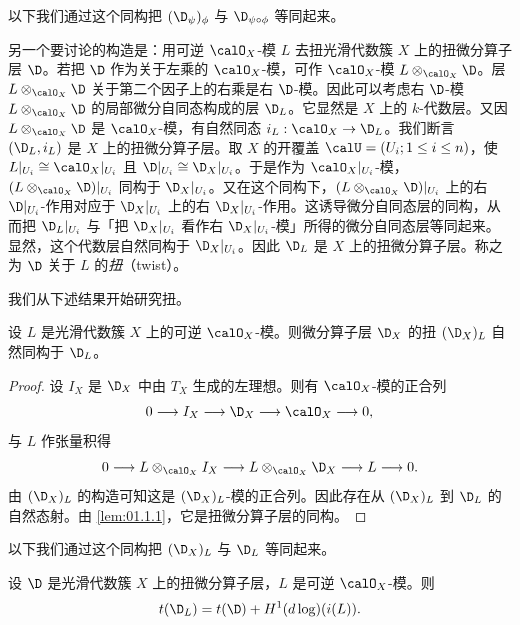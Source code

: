 以下我们通过这个同构把 $(\D_\psi)_\phi$ 与 $\D_{\psi\circ\phi}$ 等同起来。

另一个要讨论的构造是：用可逆 $\calO_X$-模 $L$ 去扭光滑代数簇 $X$ 上的扭微分算子层 $\D$。若把 $\D$ 作为关于左乘的 $\calO_X$-模，可作 $\calO_X$-模 $L\otimes_{\calO_X}\D$。层 $L\otimes_{\calO_X}\D$ 关于第二个因子上的右乘是右 $\D$-模。因此可以考虑右 $\D$-模 $L\otimes_{\calO_X}\D$ 的局部微分自同态构成的层 $\D_L$。它显然是 $X$ 上的 $k$-代数层。又因 $L\otimes_{\calO_X}\D$ 是 $\calO_X$-模，有自然同态 $i_L:\calO_X\to\D_L$。我们断言 $(\D_L,i_L)$ 是 $X$ 上的扭微分算子层。取 $X$ 的开覆盖 $\calU=(U_i;1\le i\le n)$，使 $L|_{U_i}\cong\calO_X|_{U_i}$ 且 $\D|_{U_i}\cong\D_X|_{U_i}$。于是作为 $\calO_X|_{U_i}$-模，$(L\otimes_{\calO_X}\D)|_{U_i}$ 同构于 $\D_X|_{U_i}$。又在这个同构下，$(L\otimes_{\calO_X}\D)|_{U_i}$ 上的右 $\D|_{U_i}$-作用对应于 $\D_X|_{U_i}$ 上的右 $\D_X|_{U_i}$-作用。这诱导微分自同态层的同构，从而把 $\D_L|_{U_i}$ 与「把 $\D_X|_{U_i}$ 看作右 $\D_X|_{U_i}$-模」所得的微分自同态层等同起来。显然，这个代数层自然同构于 $\D_X|_{U_i}$。因此 $\D_L$ 是 $X$ 上的扭微分算子层。称之为 $\D$ 关于 $L$ 的\emph{扭}（twist）。

我们从下述结果开始研究扭。

\begin{lemma}\label{lem:01.1.7}
设 $L$ 是光滑代数簇 $X$ 上的可逆 $\calO_X$-模。则微分算子层 $\D_X$ 的扭 $(\D_X)_L$ 自然同构于 $\D_L$。
\end{lemma}

\begin{proof}
设 $I_X$ 是 $\D_X$ 中由 $T_X$ 生成的左理想。则有 $\calO_X$-模的正合列
$$0\longrightarrow I_X\longrightarrow\D_X\longrightarrow\calO_X\longrightarrow 0,$$
与 $L$ 作张量积得
$$0\longrightarrow L\otimes_{\calO_X}I_X\longrightarrow L\otimes_{\calO_X}\D_X\longrightarrow L\longrightarrow 0.$$
由 $(\D_X)_L$ 的构造可知这是 $(\D_X)_L$-模的正合列。因此存在从 $(\D_X)_L$ 到 $\D_L$ 的自然态射。由 \ref{lem:01.1.1}，它是扭微分算子层的同构。
\end{proof}

以下我们通过这个同构把 $(\D_X)_L$ 与 $\D_L$ 等同起来。

\begin{proposition}\label{prop:01.1.8}
设 $\D$ 是光滑代数簇 $X$ 上的扭微分算子层，$L$ 是可逆 $\calO_X$-模。则
$$t(\D_L)=t(\D)+H^1(d\log)(i(L)).$$
\end{proposition}

